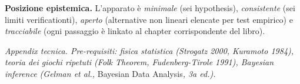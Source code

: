 \Hypoth{} \textbf{Posizione epistemica.} L'apparato è \emph{minimale}
(sei hypothesis), \emph{consistente} (sei limiti verificationti), \emph{aperto}
(alternative non lineari elencate per test empirico) e
\emph{tracciabile} (ogni passaggio è linkato al chapter corrispondente
del libro).



\emph{Appendix tecnica. Pre-requisiti: fisica statistica (Strogatz
2000, Kuramoto 1984), teoria dei giochi ripetuti (Folk Theorem,
Fudenberg-Tirole 1991), Bayesian inference (Gelman et al., }Bayesian
Data Analysis\emph{, 3a ed.).}
